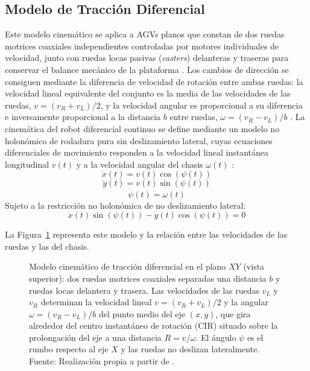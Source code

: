 \subsection{Modelo de Tracción Diferencial}
Este modelo cinemático se aplica a AGVs planos que constan de dos ruedas motrices coaxiales independientes controladas por motores individuales de velocidad, junto con ruedas locas pasivas (\textit{casters}) delanteras y traseras para conservar el balance mecánico de la plataforma \citep{perez2022navigation}. Los cambios de dirección se consiguen mediante la diferencia de velocidad de rotación entre ambas ruedas: la velocidad lineal equivalente del conjunto es la media de las velocidades de las ruedas, $v = (v_R + v_L)/2$, y la velocidad angular es proporcional a su diferencia e inversamente proporcional a la distancia $b$ entre ruedas, $\omega = (v_R - v_L)/b$ \citep{sanchez2022modelado, rodrigo2023gbnn}. La cinemática del robot diferencial continuo se define mediante un modelo no holonómico de rodadura pura sin deslizamiento lateral, cuyas ecuaciones diferenciales de movimiento responden a la velocidad lineal instantánea longitudinal $v(t)$ y a la velocidad angular del chasis $\omega(t)$ \citep{perez2022navigation}:
\begin{equation}
    \dot{x}(t) = v(t) \cos(\psi(t))
\end{equation}
\begin{equation}
    \dot{y}(t) = v(t) \sin(\psi(t))
\end{equation}
\begin{equation}
    \dot{\psi}(t) = \omega(t)
\end{equation}
Sujeto a la restricción no holonómica de no deslizamiento lateral:
\begin{equation}
    \dot{x}(t) \sin(\psi(t)) - \dot{y}(t) \cos(\psi(t)) = 0
\end{equation}

La Figura~\ref{fig:cinematica_diferencial} representa este modelo y la
relación entre las velocidades de las ruedas y las del chasis.

\begin{figure}[htbp]
    \centering
    
    \caption[Modelo cinemático de tracción diferencial]{Modelo cinemático
    de tracción diferencial en el plano $XY$ (vista superior): dos ruedas
    motrices coaxiales separadas una distancia $b$ y ruedas locas delantera
    y trasera. Las velocidades de las ruedas $v_L$ y $v_R$ determinan la
    velocidad lineal $v=(v_R+v_L)/2$ y la angular $\omega=(v_R-v_L)/b$ del
    punto medio del eje $(x,y)$, que gira alrededor del centro instantáneo
    de rotación (CIR) situado sobre la prolongación del eje a una distancia
    $R=v/\omega$. El ángulo $\psi$ es el rumbo respecto al eje $X$ y las ruedas no
    deslizan lateralmente. Fuente: Realización propia a partir de
    \citet{perez2022navigation}.}
    \label{fig:cinematica_diferencial}
\end{figure}


